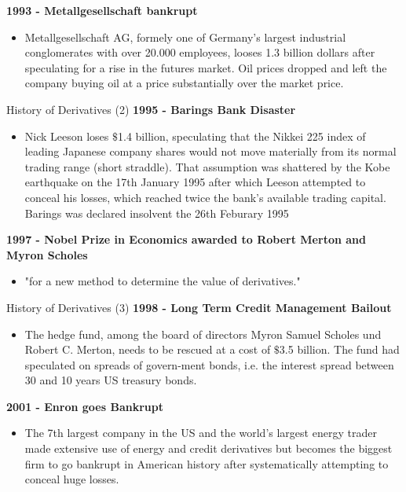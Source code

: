 \textbf{1993 - Metallgesellschaft bankrupt}
\begin{itemize}
  \item Metallgesellschaft AG, formely one of Germany's largest industrial conglomerates with over 20.000 employees, looses 1.3 billion dollars after speculating for a rise in the futures market. Oil prices dropped and left the company buying oil at a price substantially over the market price.
\end{itemize}


{History of Derivatives (2)}
\textbf{1995 - Barings Bank Disaster }
\begin{itemize}
  \item Nick Leeson loses $\$$1.4 billion, speculating that the Nikkei 225 index of leading Japanese company shares would not move materially from its normal trading range (short straddle). That assumption was shattered by the Kobe earthquake on the 17th January 1995 after which Leeson attempted to conceal his losses, which reached twice the bank's available trading capital. Barings was declared insolvent the 26th Feburary 1995
\end{itemize}
\textbf{1997 - Nobel Prize in Economics awarded to Robert Merton and Myron Scholes}
\begin{itemize}
  \item "for a new method to determine the value of derivatives."
\end{itemize}



{History of Derivatives (3)}
\textbf{1998 - Long Term Credit Management Bailout}
\begin{itemize}
  \item The hedge fund, among the board of directors Myron Samuel Scholes und Robert C. Merton, needs to be rescued at a cost of $\$$3.5 billion. The fund had speculated on spreads of govern-ment bonds, i.e. the interest spread between 30 and 10 years US treasury bonds.
\end{itemize}
\textbf{2001 - Enron goes Bankrupt}
\begin{itemize}
  \item The 7th largest company in the US and the world's largest energy trader made extensive use of energy and credit derivatives but becomes the biggest firm to go bankrupt in American history after systematically attempting to conceal huge losses.
\end{itemize}



